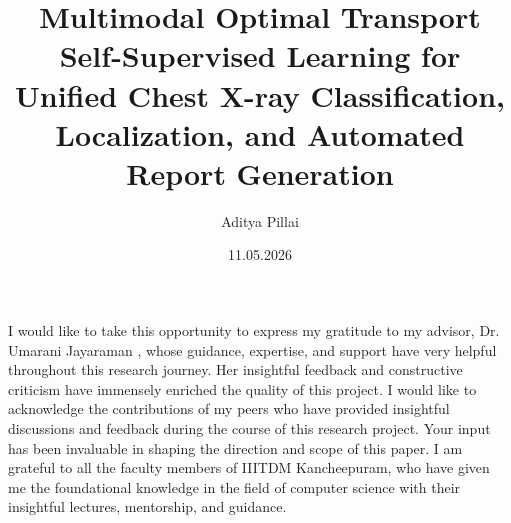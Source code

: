 \documentclass[BTech]{iiitdmdiss}
\begin{document}
\title{Multimodal Optimal Transport Self-Supervised Learning for Unified Chest X-ray Classification, Localization, and Automated Report Generation}
\author{Aditya Pillai}
\date{11.05.2026}

\nocite{*} %
\maketitle

\declaration


\certificate
\acknowledgements

I would like to take this opportunity to express my gratitude to my advisor, Dr. Umarani Jayaraman , whose guidance, expertise, and support have very helpful throughout this research journey. Her insightful feedback and constructive criticism have immensely enriched the quality of this project. I would like to acknowledge the contributions of my peers who have provided insightful discussions and feedback during the course of this research project. Your input has been invaluable in shaping the direction and scope of this paper. I am grateful to all the faculty members of IIITDM Kancheepuram, who have given me the foundational knowledge in the field of computer science with their insightful lectures, mentorship, and guidance.
\end{document}
